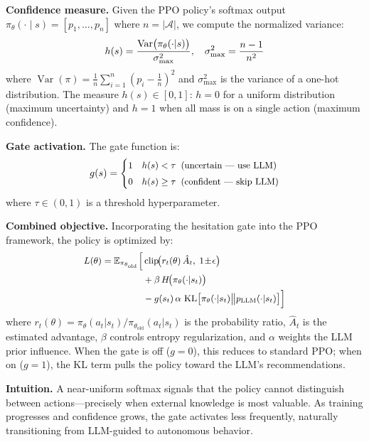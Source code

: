 \documentclass[conference]{IEEEtran}
\DeclareMathOperator{\KL}{KL}
\DeclareMathOperator{\Var}{Var}
\DeclareMathOperator{\clip}{clip}
\begin{document}
\textbf{Confidence measure.} Given the PPO policy's softmax output $\pi_\theta(\cdot \mid s) = [p_1, \ldots, p_n]$ where $n = |\mathcal{A}|$, we compute the normalized variance:
\begin{equation}
\small
h(s) = \frac{\Var\bigl(\pi_\theta(\cdot|s)\bigr)}{\sigma^2_{\max}}, \quad
\sigma^2_{\max} = \frac{n-1}{n^2}
\label{eq:hesitation}
\end{equation}
where $\Var(\pi) = \frac{1}{n}\sum_{i=1}^{n}(p_i - \frac{1}{n})^2$ and $\sigma^2_{\max}$ is the variance of a one-hot distribution. The measure $h(s) \in [0, 1]$: $h = 0$ for a uniform distribution (maximum uncertainty) and $h = 1$ when all mass is on a single action (maximum confidence).

\textbf{Gate activation.} The gate function is:
\begin{equation}
\small
g(s) =
\begin{cases}
1 & h(s) < \tau \;\;\text{(uncertain --- use LLM)} \\[3pt]
0 & h(s) \geq \tau \;\;\text{(confident --- skip LLM)}
\end{cases}
\label{eq:gate}
\end{equation}
where $\tau \in (0, 1)$ is a threshold hyperparameter.

\textbf{Combined objective.} Incorporating the hesitation gate into the PPO framework, the policy is optimized by:
\begin{equation}
\small
\begin{aligned}
L(\theta) = \mathbb{E}_{\pi_{\theta_{\mathrm{old}}}}\Bigl[
  & \clip\!\bigl(r_t(\theta)\,\hat{A}_t,\; 1\!\pm\!\epsilon\bigr) \\
  &+ \beta\, H\!\bigl(\pi_\theta(\cdot|s_t)\bigr) \\
  &- g(s_t)\,\alpha\, \KL\bigl[\pi_\theta(\cdot|s_t) \big\| p_{\mathrm{LLM}}(\cdot|s_t)\bigr] \Bigr]
\end{aligned}
\label{eq:ppo_prior}
\end{equation}
where $r_t(\theta) = \pi_\theta(a_t|s_t) / \pi_{\theta_{\mathrm{old}}}(a_t|s_t)$ is the probability ratio, $\hat{A}_t$ is the estimated advantage, $\beta$ controls entropy regularization, and $\alpha$ weights the LLM prior influence. When the gate is off ($g\!=\!0$), this reduces to standard PPO; when on ($g\!=\!1$), the KL term pulls the policy toward the LLM's recommendations.

\textbf{Intuition.} A near-uniform softmax signals that the policy cannot distinguish between actions---precisely when external knowledge is most valuable. As training progresses and confidence grows, the gate activates less frequently, naturally transitioning from LLM-guided to autonomous behavior.
\end{document}
